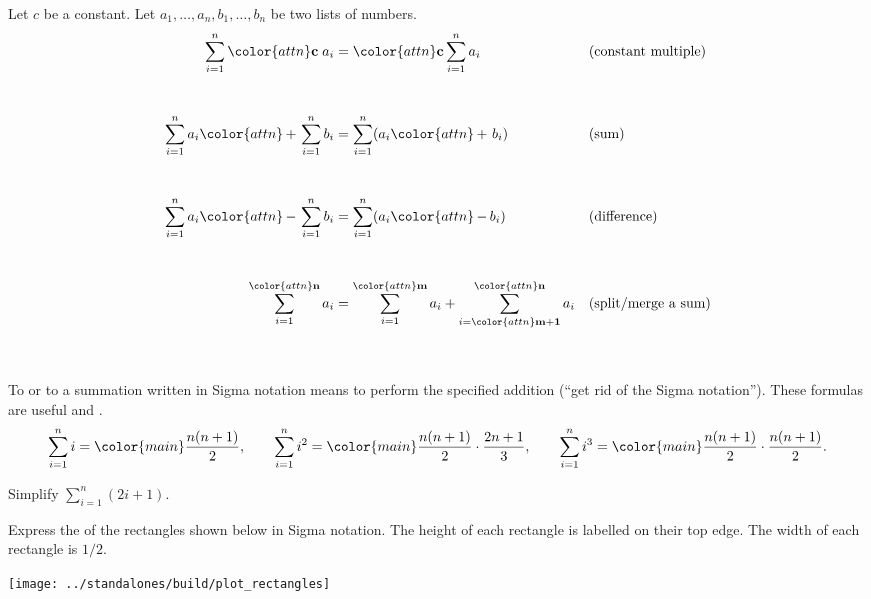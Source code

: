 \documentclass[../main.tex]{subfiles}
\begin{document}
  \clearpage
  \begin{mdframed}[style=withref-compact]
    \label{page:summation-properties}
    Let \(c\) be a constant. Let \(a_{1}, \dots, a_{n}, b_{1}, \dots, b_{n}\) be two lists of numbers. 
    \begin{align*}
      \sum_{i=1}^{n} {\color{attn} \mathbf{c}} \; a_{i} 
      &= {\color{attn} \mathbf{c}} \sum_{i=1}^{n} a_{i} 
      &&\text{(constant multiple)} \\[6ex]
      \sum_{i=1}^{n} a_{i} {\color{attn}\,\mathbf{+}\,} \sum_{i=1}^{n} b_{i} 
      &= \sum_{i=1}^{n} (a_{i} {\color{attn}\,\mathbf{+}\,}\, b_{i}) 
      &&\text{(sum)} \\[6ex]
      \sum_{i=1}^{n} a_{i} {\color{attn}\,\mathbf{-}\,} \sum_{i=1}^{n} b_{i} 
      &= \sum_{i=1}^{n} (a_{i} {\color{attn}\,\mathbf{-}\,} b_{i})
      && \text{(difference)} \\[6ex]
      \sum_{i=1}^{{\color{attn}\mathbf{n}}} a_{i} 
      &= 
      \sum_{i=1}^{{\color{attn}\mathbf{m}}} a_{i} + 
      \sum_{i={\color{attn}\mathbf{m+1}}}^{{\color{attn}\mathbf{n}}} a_{i} 
      && \text{(split/merge a sum)} \\[6ex]
    \end{align*}

  \end{mdframed}

  To  or to  a summation written in Sigma notation means to perform the specified addition (``get rid of the Sigma notation'').  These formulas are useful and .
  \begin{equation} \label{formula:summations}
    \sum_{i=1}^{n} i = {\color{main} \frac{n(n+1)}{2}}, \qquad \sum_{i=1}^{n} i^{2} = {\color{main}\frac{n(n+1)}{2}} \cdot \frac{2n+1}{3}, \qquad \sum_{i=1}^{n} i^{3} = {\color{main}\frac{n(n+1)}{2}} \cdot \frac{n(n+1)}{2}.
  \end{equation}

  \begin{example}
    Simplify \(\sum_{i=1}^{n}(2i + 1)\).
  \end{example}
  \clearpage

  \begin{example}
    Express the  of the rectangles shown below in Sigma notation. The height of each rectangle is labelled on their top edge. The width of each rectangle is \(1/2\).

    \begin{center}
      \texttt{[image: ../standalones/build/plot\_rectangles]}
    \end{center}
  \end{example}
  \clearpage
\end{document}
